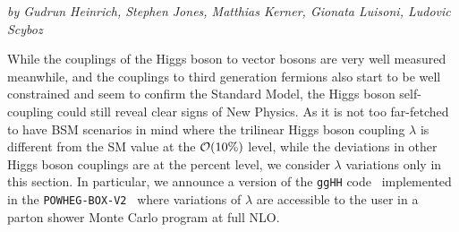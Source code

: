 \label{subsec:varylambda}

\begin{center}
\textit{by  Gudrun Heinrich, Stephen Jones, Matthias Kerner, Gionata Luisoni, Ludovic Scyboz}
\end{center}

While the couplings of the Higgs boson to vector bosons are very well measured meanwhile, 
and the couplings to third generation fermions also start to be well constrained and seem to confirm the Standard Model, 
the Higgs boson self-coupling could still reveal clear signs of New Physics. 
As it is not too far-fetched to have BSM scenarios in mind where the trilinear Higgs boson coupling $\lambda$ is different from the SM value at the ${\cal O}(10\%)$ level, while the deviations in other Higgs boson couplings are at the percent level, we consider $\lambda$ variations only in this section.
In particular, we announce a version of the {\tt ggHH} code~\cite{Borowka:2016ypz,Heinrich:2017kxx,Borowka:2016ehy} implemented in the {\tt POWHEG-BOX-V2}~\cite{Alioli:2010xd} where variations of  $\lambda$ are accessible to the user in a parton shower Monte Carlo program at full NLO.


